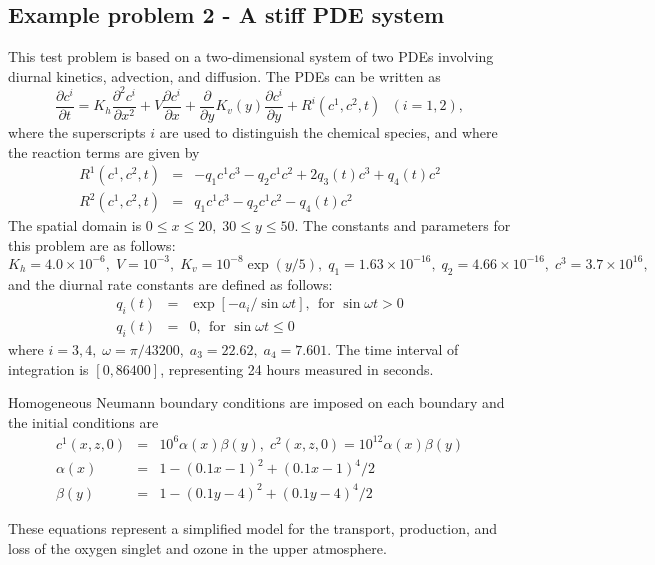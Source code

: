 \subsection{Example problem 2 - A stiff PDE system}

This test problem is based on a two-dimensional system of two PDEs involving
diurnal kinetics, advection, and diffusion. The PDEs can be written as 
\begin{equation}
\frac{\partial c^i}{\partial t}=K_h\frac{\partial^2 c^i}{\partial x^2}
 +V \frac{\partial c^i}{\partial x}
 + \frac{\partial} {\partial y} K_v(y) \frac{\partial c^i}{\partial y}
 + R^i(c^1,c^2,t) ~~~ (i=1,2),  \label{PDE2}
\end{equation}
where the superscripts $i$ are used to distinguish the chemical species, and
where the reaction terms are given by 
\begin{eqnarray}
R^1(c^1,c^2,t) &=&-q_1c^1c^3-q_2c^1c^2+2q_3(t)c^3+q_4(t)c^2  \label{react} \\
R^2(c^1,c^2,t) &=&q_1c^1c^3-q_2c^1c^2-q_4(t)c^2  \nonumber
\end{eqnarray}
The spatial domain is $0 \leq x \leq 20,\;30 \leq y \leq 50$. The constants
and parameters for this problem are as follows: $K_h=4.0\times
10^{-6},\;V=10^{-3},\;K_v=10^{-8}\exp (y/5),\;q_1=1.63\times
10^{-16},\;q_2=4.66\times 10^{-16},\;c^3=3.7\times 10^{16},$ and the diurnal
rate constants are defined as follows: 
\begin{eqnarray*}
q_i(t) &=&\exp [-a_i/\sin \omega t],~~\mbox{for }\sin \omega t>0 \\
q_i(t) &=&0,~~\mbox{for }\sin \omega t\leq 0
\end{eqnarray*}
where $i=3,4,\;\omega =\pi /43200,\;a_3=22.62,\;a_4=7.601.$
The time interval of integration is $[0, 86400]$, representing 24
hours measured in seconds.

Homogeneous Neumann boundary conditions are imposed on each boundary and the
initial conditions are 
\begin{eqnarray}
c^{1}(x,z,0) &=&10^{6}\alpha (x)\beta (y),\;c^{2}(x,z,0)=10^{12}\alpha
(x)\beta (y)  \nonumber \\
\alpha (x) &=&1-(0.1x-1)^{2}+(0.1x-1)^{4}/2  \label{stiffIC} \\
\beta (y) &=&1-(0.1y-4)^{2}+(0.1y-4)^{4}/2  \nonumber
\end{eqnarray}

These equations represent a simplified model for the transport, production,
and loss of the oxygen singlet and ozone in the upper atmosphere.

